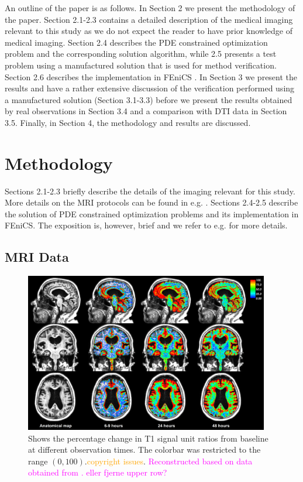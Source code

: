 \documentclass[11pt,a4paper]{article}
\newcommand{\fixme}[1]{\textcolor{orange}{#1}}
\newcommand{\lars}[1]{\textcolor{magenta}{#1}}
\begin{document}
An outline of the paper is as follows. 
In Section 2 we present the methodology of the paper. Section 2.1-2.3 contains a detailed description of the medical imaging 
relevant to this study as we do not expect the reader to have prior knowledge of medical imaging. Section 2.4
describes the PDE constrained optimization problem and the corresponding solution algorithm, while 2.5 presents
a test problem using a manufactured solution that is used for method verification. Section 2.6 describes the implementation 
in FEniCS \cite{LoggMardalEtAl2012a}. In Section 3 we present the results and have a rather extensive discussion of the verification performed
using a manufactured solution (Section 3.1-3.3) before we present the results obtained by real observations in Section 3.4     
and a comparison with DTI data in Section 3.5. Finally, in Section 4, the methodology and results are discussed.  
   
\section{Methodology}

Sections 2.1-2.3 briefly describe the details of the imaging relevant for this study. More details on the MRI protocols can be
found in e.g. \cite{ringstad2018brain}. Sections 2.4-2.5 describe the solution of PDE constrained optimization problems and
its implementation in FEniCS. The exposition is, however, brief and we refer to e.g. \cite{hinze2008optimization} for more details. 



\subsection{MRI Data}
\begin{figure}
\includegraphics[width=0.95\textwidth]{PatID-68-new-100.png} 
\caption{Shows the percentage change in T1 signal unit ratios from baseline at different observation times. The colorbar was restricted to the range $(0,100)$.\fixme{copyright issues}. \lars{Reconstructed based on data obtained from \cite{eidevalnes}. eller fjerne upper row? } }
\label{fig1} 
\end{figure}
\end{document}
